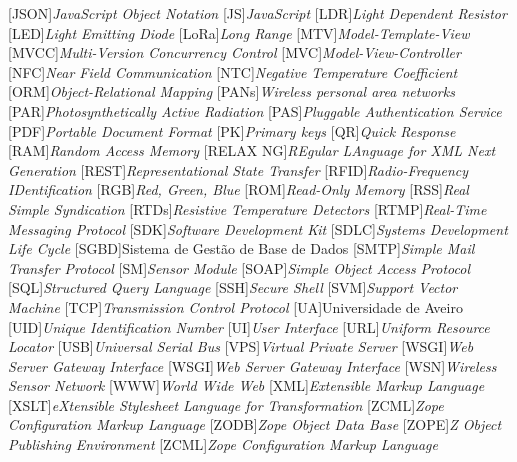 \begin{multicols}{2}
\begin{acronym}[RELAX NG]
	[JSON]{\textit{JavaScript Object Notation}}
	[JS]{\textit{JavaScript}}
	[LDR]{\textit{Light Dependent Resistor}}
	[LED]{\textit{Light Emitting Diode}}
	[LoRa]{\textit{Long Range}}
	[MTV]{\textit{Model-Template-View}}
	[MVCC]{\textit{Multi-Version Concurrency Control}}
	[MVC]{\textit{Model-View-Controller}}
	[NFC]{\textit{Near Field Communication}}
	[NTC]{\textit{Negative Temperature Coefficient}}
	[ORM]{\textit{Object-Relational Mapping}}
	[PANs]{\textit{Wireless personal area networks}}
	[PAR]{\textit{Photosynthetically Active Radiation}}
	[PAS]{\textit{Pluggable Authentication Service}}
	[PDF]{\textit{Portable Document Format}}
	[PK]{\textit{Primary keys}}
	[QR]{\textit{Quick Response}}
	[RAM]{\textit{Random Access Memory}}
	[RELAX NG]{\textit{REgular LAnguage for XML Next Generation}}
	[REST]{\textit{Representational State Transfer}}
	[RFID]{\textit{Radio-Frequency IDentification}}
	[RGB]{\textit{Red, Green, Blue}}
	[ROM]{\textit{Read-Only Memory}}
	[RSS]{\textit{Real Simple Syndication}}
	[RTDs]{\textit{Resistive Temperature Detectors}}
	[RTMP]{\textit{Real-Time Messaging Protocol}}
	[SDK]{\textit{Software Development Kit}}
	[SDLC]{\textit{Systems Development Life Cycle}}
	[SGBD]{Sistema de Gestão de Base de Dados}
	[SMTP]{\textit{Simple Mail Transfer Protocol}}
	[SM]{\textit{Sensor Module}}
	[SOAP]{\textit{Simple Object Access Protocol}}
	[SQL]{\textit{Structured Query Language}}
	[SSH]{\textit{Secure Shell}}
	[SVM]{\textit{Support Vector Machine}}
	[TCP]{\textit{Transmission Control Protocol}}
	[UA]{Universidade de Aveiro}
	[UID]{\textit{Unique Identification Number}}
	[UI]{\textit{User Interface}}
	[URL]{\textit{Uniform Resource Locator}}
	[USB]{\textit{Universal Serial Bus}}
	[VPS]{\textit{Virtual Private Server }}
	[WSGI]{\textit{Web Server Gateway Interface }}
	[WSGI]{\textit{Web Server Gateway Interface}}
	[WSN]{\textit{Wireless Sensor Network}}
	[WWW]{\textit{World Wide Web}}
	[XML]{\textit{Extensible Markup Language}}
	[XSLT]{\textit{eXtensible Stylesheet Language for Transformation}}
	[ZCML]{\textit{Zope Configuration Markup Language}}
	[ZODB]{\textit{Zope Object Data Base}}
	[ZOPE]{\textit{Z Object Publishing Environment}}
	[ZCML]{\textit{Zope Configuration Markup Language}}
	
\end{acronym}

\end{multicols}

